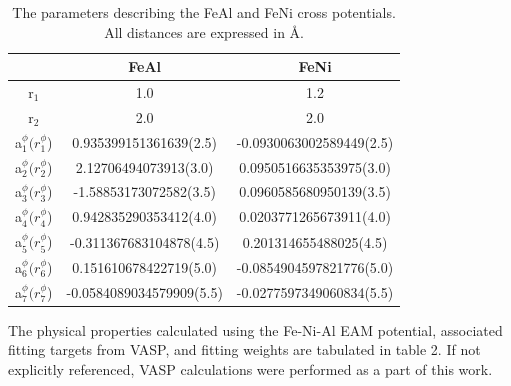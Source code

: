 \documentclass[review]{elsarticle}
\begin{document}
\begin{table}[htbp]
\caption{The parameters describing the FeAl and FeNi cross potentials.  All distances are expressed in \AA{}.}
\begin{center}
\begin{tabular}{|c|c|c|}
	\hline
	& FeAl & FeNi  \\
	 \hline
	 r$_{1}$ & 1.0 & 1.2  \\
	 r$_{2}$ & 2.0 & 2.0 \\
	 a$_{1}^{\phi}(r_{1}^{\phi}$) & 0.935399151361639(2.5) & -0.0930063002589449(2.5)  \\
	 a$_{2}^{\phi}(r_{2}^{\phi}$) & 2.12706494073913(3.0) & 0.0950516635353975(3.0) \\
	 a$_{3}^{\phi}(r_{3}^{\phi}$) & -1.58853173072582(3.5) & 0.0960585680950139(3.5)  \\
	 a$_{4}^{\phi}(r_{4}^{\phi}$) & 0.942835290353412(4.0) & 0.0203771265673911(4.0)  \\
	 a$_{5}^{\phi}(r_{5}^{\phi}$) & -0.311367683104878(4.5) & 0.201314655488025(4.5)  \\
	 a$_{6}^{\phi}(r_{6}^{\phi}$) & 0.151610678422719(5.0) & -0.0854904597821776(5.0)  \\
	 a$_{7}^{\phi}(r_{7}^{\phi}$) & -0.0584089034579909(5.5) & -0.0277597349060834(5.5)  \\
	  \hline
\end{tabular}
\end{center}
\label{default}
\end{table}%

The physical properties calculated using the Fe-Ni-Al EAM potential, associated fitting targets from VASP, and fitting weights are tabulated in table 2.  If not explicitly referenced, VASP calculations were performed as a part of this work.
\end{document}

